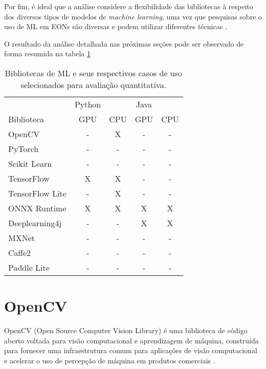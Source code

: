 Por fim, é ideal que a análise considere a flexibilidade das bibliotecas à respeito dos diversos tipos de modelos de \textit{machine learning}, uma vez que pesquisas sobre o uso de ML em EONs são diversas e podem utilizar diferentes técnicas \cite{eon_ml_survey_2020}.

O resultado da análise detalhada nas próximas seções pode ser observado de forma resumida na tabela \ref{tab:literature}


\begin{table}
    \centering
    \begin{tabular}{lcccc}
        \toprule
                        & Python &     & Java &     \\
        Biblioteca      & GPU    & CPU & GPU  & CPU \\
        \midrule
        OpenCV          & -      & X   & -    & -   \\
        PyTorch         & -      & -   & -    & -   \\
        Scikit Learn    & -      & -   & -    & -   \\
        TensorFlow      & X      & X   & -    & -   \\
        TensorFlow Lite & -      & X   & -    & -   \\
        ONNX Runtime    & X      & X   & X    & X   \\
        Deeplearning4j  & -      & -   & X    & X   \\
        MXNet           & -      & -   & -    & -   \\
        Caffe2          & -      & -   & -    & -   \\
        Paddle Lite     & -      & -   & -    & -   \\
        \bottomrule
    \end{tabular}
    \caption{Bibliotecas de ML e seus respectivos casos de uso selecionados para avaliação quantitativa.}
    \label{tab:literature}
\end{table}

\section{OpenCV}

OpenCV (Open Source Computer Vision Library) é uma biblioteca de código aberto voltada para visão computacional e aprendizagem de máquina, construída para fornecer uma infraestrutura comum para aplicações de visão computacional e acelerar o uso de percepção de máquina em produtos comerciais \cite{ml_site_opencv}.

